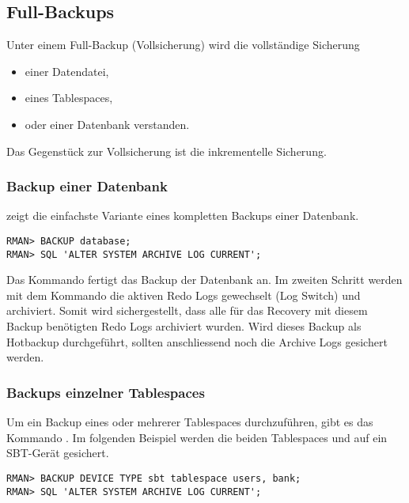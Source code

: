       \subsection{Full-Backups}
        Unter einem Full-Backup (Vollsicherung) wird die vollständige Sicherung
        \begin{itemize}
          \item einer Datendatei,
          \item eines Tablespaces,
          \item oder einer Datenbank verstanden.
        \end{itemize}
        Das Gegenstück zur Vollsicherung ist die inkrementelle Sicherung.
        \subsubsection{Backup einer Datenbank}
           zeigt die einfachste Variante eines kompletten Backups einer Datenbank.
          \begin{lstlisting}[caption={Backup einer ganzen Datenbank},label=admin1309,language=rman,emph={[9]ALTER,SYSTEM,ARCHIVE,LOG,CURRENT},emphstyle={[9]\color{magenta}\bfseries}]
RMAN> BACKUP database;
RMAN> SQL 'ALTER SYSTEM ARCHIVE LOG CURRENT';
          \end{lstlisting}
          Das Kommando  fertigt das Backup der Datenbank an. Im zweiten Schritt werden mit dem Kommando  die aktiven Redo Logs gewechselt (Log Switch) und archiviert. Somit wird sichergestellt, dass alle für das Recovery mit diesem Backup benötigten Redo Logs archiviert wurden. Wird dieses Backup als Hotbackup durchgeführt, sollten anschliessend noch die Archive Logs gesichert werden.
        \subsubsection{Backups einzelner Tablespaces}
          Um ein Backup eines oder mehrerer Tablespaces durchzuführen, gibt es das Kommando . Im folgenden Beispiel werden die beiden Tablespaces  und  auf ein SBT-Gerät gesichert.
          \begin{lstlisting}[caption={Backup eines Tablespace},label=admin1310,language=rman,emph={[9]ALTER,SYSTEM,ARCHIVE,LOG,CURRENT},emphstyle={[9]\color{magenta}\bfseries}]
RMAN> BACKUP DEVICE TYPE sbt tablespace users, bank;
RMAN> SQL 'ALTER SYSTEM ARCHIVE LOG CURRENT';
          \end{lstlisting}
